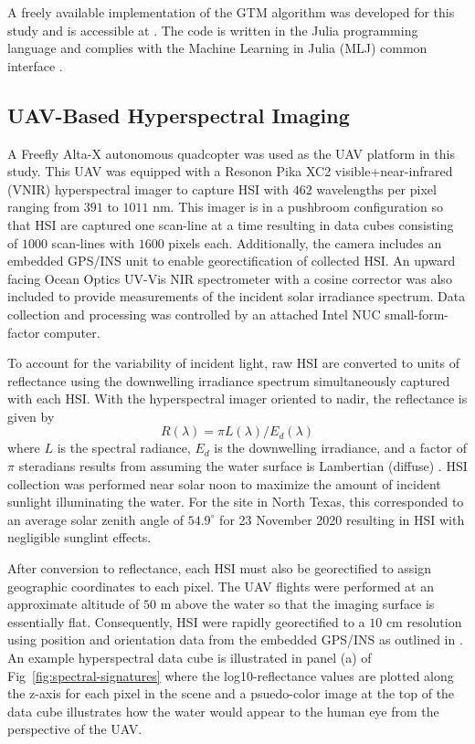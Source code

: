 \documentclass[remotesensing,article,submit,pdftex,moreauthors]{Definitions/mdpi}
\begin{document}
A freely available implementation of the GTM algorithm was developed for this study and is accessible at \cite{gtm-code}. The code is written in the Julia programming language and complies with the Machine Learning in Julia (MLJ) common interface \cite{bezanson2012julia,blaom2020mlj}.

\subsection{UAV-Based Hyperspectral Imaging}

A Freefly Alta-X autonomous quadcopter was used as the UAV platform in this study. This UAV was equipped with a Resonon Pika XC2 visible+near-infrared (VNIR) hyperspectral imager to capture HSI with $462$ wavelengths per pixel ranging from $391$ to $1011$ nm. This imager is in a pushbroom configuration so that HSI are captured one scan-line at a time resulting in data cubes consisting of $1000$ scan-lines with $1600$ pixels each. Additionally, the camera includes an embedded GPS/INS unit to enable georectification of collected HSI. An upward facing Ocean Optics UV-Vis NIR spectrometer with a cosine corrector was also included to provide measurements of the incident solar irradiance spectrum. Data collection and processing was controlled by an attached Intel NUC small-form-factor computer.

To account for the variability of incident light, raw HSI are converted to units of reflectance using the downwelling irradiance spectrum simultaneously captured with each HSI. With the hyperspectral imager oriented to nadir, the reflectance is given by
\begin{equation}\label{eq:reflectance}
    R(\lambda) = \pi L(\lambda)/E_d(\lambda)
\end{equation}
where $L$ is the spectral radiance, $E_d$ is the downwelling irradiance, and a factor of $\pi$ steradians results from assuming the water surface is Lambertian (diffuse) \cite{ruddick2019review}. HSI collection was performed near solar noon to maximize the amount of incident sunlight illuminating the water. For the site in North Texas, this corresponded to an average solar zenith angle of $54.9^\circ$ for 23 November 2020 resulting in HSI with negligible sunglint effects.

After conversion to reflectance, each HSI must also be georectified to assign geographic coordinates to each pixel. The UAV flights were performed at an approximate altitude of $50$ m above the water so that the imaging surface is essentially flat. Consequently, HSI were rapidly georectified to a $10$ cm resolution using position and orientation data from the embedded GPS/INS as outlined in \cite{muller2002program, baumker2001new, mostafa2000multi}. An example hyperspectral data cube is illustrated in panel (a) of Fig~\ref{fig:spectral-signatures} where the log10-reflectance values are plotted along the z-axis for each pixel in the scene and a psuedo-color image at the top of the data cube illustrates how the water would appear to the human eye from the perspective of the UAV.
\end{document}

